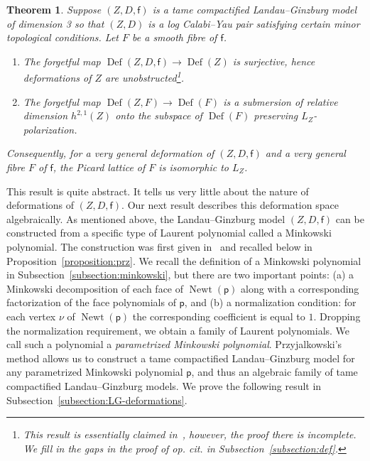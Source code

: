 \documentclass[10pt]{amsart}
\numberwithin{equation}{section}
\theoremstyle{plain}
\newtheorem{theorem}{Theorem}[section]
\theoremstyle{definition}
\theoremstyle{remark}
\DeclareMathOperator{\Def}{Def}
\DeclareMathOperator{\Newt}{Newt}
\begin{document}
\begin{theorem}
  Suppose \((Z,D,\mathsf{f})\) is a tame compactified Landau--Ginzburg model of dimension 3 so that \((Z,D)\) is a log Calabi--Yau pair satisfying certain minor topological conditions. Let \(F\) be a smooth fibre of \(\mathsf{f}\).
  \begin{enumerate}
  \item The forgetful map \(\Def(Z,D,\mathsf{f})\rightarrow \Def(Z)\) is surjective, hence deformations of \(Z\) are unobstructed\footnote{This result is essentially claimed in~\cite[Corollary 2.18]{katzarkov2017bogomolov}, however, the proof there is incomplete. We fill in the gaps in the proof of {op. cit.} in Subsection~\ref{subsection:def}.}.
  \item The forgetful map \(\Def(Z,F) \rightarrow \Def(F)\) is a submersion of relative dimension \(h^{2,1}(Z)\) onto the subspace of \(\Def(F)\) preserving \(L_Z\)-polarization.
  \end{enumerate}
  Consequently, for a very general deformation of \((Z,D,\mathsf{f})\) and a very general fibre \(F\) of \(\mathsf{f}\), the Picard lattice of \(F\) is isomorphic to \(L_Z\).
\end{theorem}

This result is quite abstract. It tells us very little about the nature of deformations of \((Z,D,\mathsf{f})\). Our next result describes this deformation space algebraically. As mentioned above, the Landau--Ginzburg model \((Z,D,\mathsf{f})\) can be constructed from a specific type of Laurent polynomial called a Minkowski polynomial. The construction was first given in~\cite{przyjalkowski2017compactification} and recalled below in Proposition~\ref{proposition:prz}. We recall the definition of a Minkowski polynomial in Subsection~\ref{subsection:minkowski}, but there are two important points: (a) a Minkowski decomposition of each face of \(\Newt(\mathsf{p})\) along with a corresponding factorization of the face polynomials of \(\mathsf{p}\), and (b) a normalization condition: for each vertex \(\nu\) of \(\Newt(\mathsf{p})\) the corresponding coefficient is equal to \(1\). Dropping the normalization requirement, we obtain a family of Laurent polynomials. We call such a polynomial a \emph{parametrized Minkowski polynomial}. Przyjalkowski's method allows us to construct a tame compactified Landau--Ginzburg model for any parametrized Minkowski polynomial \(\mathsf{p}\), and thus an algebraic family of tame compactified Landau--Ginzburg models. We prove the following result in Subsection~\ref{subsection:LG-deformations}.
\end{document}
